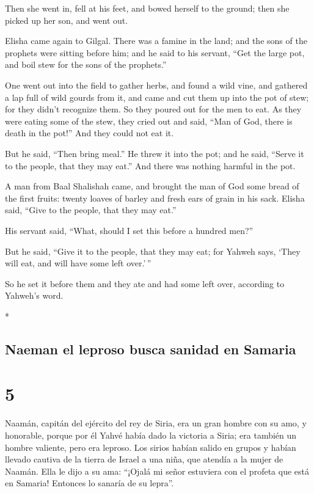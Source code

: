 \begin{paracol}{2}
\begin{otherlanguage}{english}
 Then she went in, fell at his feet, and bowed herself to
the ground; then she picked up her son, and went out.

 Elisha came again to Gilgal. There was a famine in the
land; and the sons of the prophets were sitting before him; and he said
to his servant, ``Get the large pot, and boil stew for the sons of the
prophets.''

 One went out into the field to gather herbs, and found a
wild vine, and gathered a lap full of wild gourds from it, and came and
cut them up into the pot of stew; for they didn't recognize them.
 So they poured out for the men to eat. As they were
eating some of the stew, they cried out and said, ``Man of God, there is
death in the pot!'' And they could not eat it.

 But he said, ``Then bring meal.'' He threw it into the
pot; and he said, ``Serve it to the people, that they may eat.'' And
there was nothing harmful in the pot.

 A man from Baal Shalishah came, and brought the man of
God some bread of the first fruits: twenty loaves of barley and fresh
ears of grain in his sack. Elisha said, ``Give to the people, that they
may eat.''

 His servant said, ``What, should I set this before a
hundred men?''

But he said, ``Give it to the people, that they may eat; for Yahweh
says, `They will eat, and will have some left over.'\,''

 So he set it before them and they ate and had some left
over, according to Yahweh's word.

\end{otherlanguage}

\switchcolumn[0]*

\hypertarget{naeman-el-leproso-busca-sanidad-en-samaria}{%
\subsection{Naeman el leproso busca sanidad en
Samaria}\label{naeman-el-leproso-busca-sanidad-en-samaria}}

\hypertarget{section-8}{%
\section{5}\label{section-8}}

 Naamán, capitán del ejército del rey de Siria, era un
gran hombre con su amo, y honorable, porque por él Yahvé había dado la
victoria a Siria; era también un hombre valiente, pero era leproso.
 Los sirios habían salido en grupos y habían llevado
cautiva de la tierra de Israel a una niña, que atendía a la mujer de
Naamán.  Ella le dijo a su ama: ``¡Ojalá mi señor
estuviera con el profeta que está en Samaria! Entonces lo sanaría de su
lepra''.


\end{paracol}
